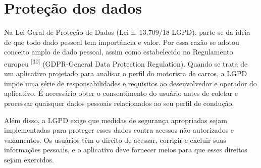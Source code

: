 \section{Proteção dos dados}

Na Lei Geral de Proteção de Dados (Lei n. 13.709/18-LGPD), parte-se da ideia de que todo dado pessoal tem importância e valor. Por essa razão se adotou conceito amplo de dado pessoal, assim como estabelecido no Regulamento europeu \textsuperscript{[30]} (GDPR-General Data Protection  Regulation). Quando se trata de um aplicativo projetado para analisar o perfil do motorista de carros, a LGPD impõe uma série de responsabilidades e requisitos ao desenvolvedor e operador do aplicativo. É necessário obter o consentimento  do usuário antes de coletar e processar quaisquer dados pessoais relacionados ao seu perfil de condução.

Além disso, a LGPD exige que medidas de segurança apropriadas sejam implementadas para proteger esses dados contra acessos não autorizados e vazamentos. Os usuários têm o direito de acessar, corrigir e excluir suas informações pessoais, e o aplicativo deve fornecer meios para que esses direitos sejam exercidos.



